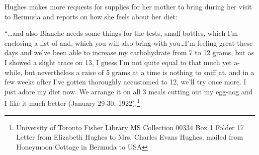 \documentclass[12pt]{article}
\begin{document}
Hughes makes more requests for supplies for her mother to bring during her visit to Bermuda and reports on how she feels about her diet:
\begin{singlespace}
``\dots and also Blanche needs some things for the tests, small bottles, which I'm enclosing a list of and, which you will also bring with you\dots I'm feeling great these days and we've been able to increase my carbohydrate from 7 to 12 grams, but as I showed a slight trace on 13, I guess I'm not quite equal to that much yet a-while, but nevertheless a raise of 5 grams at a time is nothing to sniff at, and in a few weeks after I've gotten thoroughly accustomed to 12, we'll try once more. I just adore my diet now. We arrange it on all 3 meals cutting out my egg-nog and I like it much better (January 29-30, 1922).\footnote{University of Toronto Fisher Library MS Collection 00334 Box 1 Folder 17 Letter from Elizabeth Hughes to Mrs. Charles Evans Hughes, mailed from Honeymoon Cottage in Bermuda to USA} 
\end{singlespace}
\end{document}
